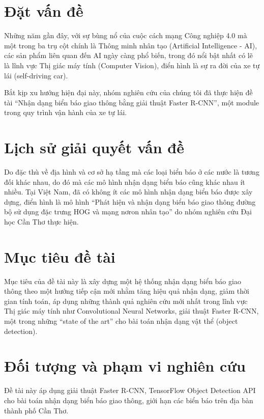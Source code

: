 \documentclass[../thesis.tex]{subfiles}
\begin{document}
\section{Đặt vấn đề}

Những năm gần đây, với sự bùng nổ của cuộc cách mạng Công nghiệp 4.0 mà một trong ba trụ cột chính là Thông minh nhân tạo (Artificial Intelligence - AI), các sản phẩm liên quan đến AI ngày càng phổ biến, trong đó nổi bật nhất có lẽ là lĩnh vực Thị giác máy tính (Computer Vision), điển hình là sự ra đời của xe tự lái (self-driving car). 

Bắt kịp xu hướng hiện đại này, nhóm nghiên cứu của chúng tôi đã thực hiện đề tài ``Nhận dạng biển báo giao thông bằng giải thuật Faster R-CNN'', một module trong quy trình vận hành của xe tự lái.

\section{Lịch sử giải quyết vấn đề}

Do đặc thù về địa hình và cơ sở hạ tầng mà các loại biển báo ở các nước là tương đối khác nhau, do đó mà các mô hình nhận dạng biển báo cũng khác nhau ít nhiều. Tại Việt Nam, đã có không ít các mô hình nhận dạng biển báo được xây dựng, điển hình là mô hình ``Phát hiện và nhận dạng biển báo giao thông đường bộ sử dụng đặc trưng HOG và mạng nơron nhân tạo'' do nhóm nghiên cứu Đại học Cần Thơ thực hiện\cite{nhandangbienbaodhct}.

\section{Mục tiêu đề tài}

Mục tiêu của đề tài này là xây dựng một hệ thống nhận dạng biển báo giao thông theo một hướng tiếp cận mới nhằm tăng hiệu quả nhận dạng, giảm thời gian tính toán, áp dụng những thành quả nghiên cứu mới nhất trong lĩnh vực Thị giác máy tính như Convolutional Neural Networks, giải thuật Faster R-CNN\cite{renNIPS15fasterrcnn}, một trong những ``state of the art'' cho bài toán nhận dạng vật thể (object detection).

\section{Đối tượng và phạm vi nghiên cứu}

Đề tài này áp dụng giải thuật Faster R-CNN, TensorFlow Object Detection API cho bài toán nhận dạng biển báo giao thông, giới hạn các biển báo trên địa bàn thành phố Cần Thơ. 
\end{document}
